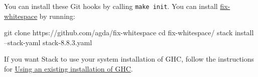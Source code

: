 You can install these Git hooks by calling \texttt{make\ init}. You can
install \href{https://github.com/agda/fix-whitespace}{fix-whitespace} by
running:

\begin{myDisplay}
git clone https://github.com/agda/fix-whitespace
cd fix-whitespace/
stack install --stack-yaml stack-8.8.3.yaml
\end{myDisplay}

If you want Stack to use your system installation of GHC, follow the
instructions for
\protect\hyperlink{using-an-existing-installation-of-ghc}{Using an
existing installation of GHC}.


